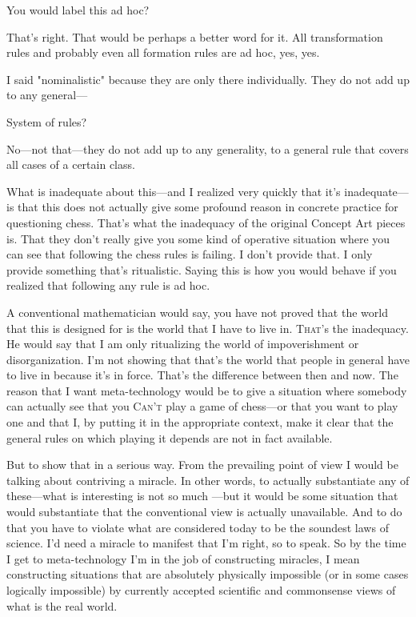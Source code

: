  You would label this ad hoc? 

 That's right. That would be perhaps a better word for it. All 
transformation rules and probably even all formation rules are ad hoc, 
yes, yes. 

I said "nominalistic" because they are only there individually. 
They do not add up to any general--- 

 System of rules? 

 No---not that---they do not add up to any generality, to a 
general rule that covers all cases of a certain class. 

What is inadequate about this---and I realized very quickly that 
it's inadequate---is that this does not actually give some profound 
reason in concrete practice for questioning chess. That's what the 
inadequacy of the original Concept Art pieces is. That they don't really 
give you some kind of operative situation where you can see that 
following the chess rules is failing. I don't provide that. I only provide 
something that's ritualistic. Saying this is how you would behave if you 
realized that following any rule is ad hoc. 

A conventional mathematician would say, you have not proved 
that the world that this is designed for is the world that I have to live in. 
\textsc{That}'s the inadequacy. He would say that I am only ritualizing the 
world of impoverishment or disorganization. I'm not showing that 
that's the world that people in general have to live in because it's in 
force. That's the difference between then and now. The reason that I 
want meta-technology would be to give a situation where somebody 
can actually see that you \textsc{Can't} play a game of chess---or that you want 
to play one and that I, by putting it in the appropriate context, make it 
clear that the general rules on which playing it depends are not in fact 
available. 

But to show that in a serious way. From the prevailing point of 
view I would be talking about contriving a miracle. In other words, to 
actually substantiate any of these---what is interesting is not so much 
---but it would be some situation that would substantiate 
that the conventional view is actually unavailable. And to do 
that you have to violate what are considered today to be the soundest 
laws of science. I'd need a miracle to manifest that I'm right, so to 
speak. So by the time I get to meta-technology I'm in the job of 
constructing miracles, I mean constructing situations that are
absolutely physically impossible (or in some cases logically impossible) by 
currently accepted scientific and commonsense views of what is the real 
world. 

